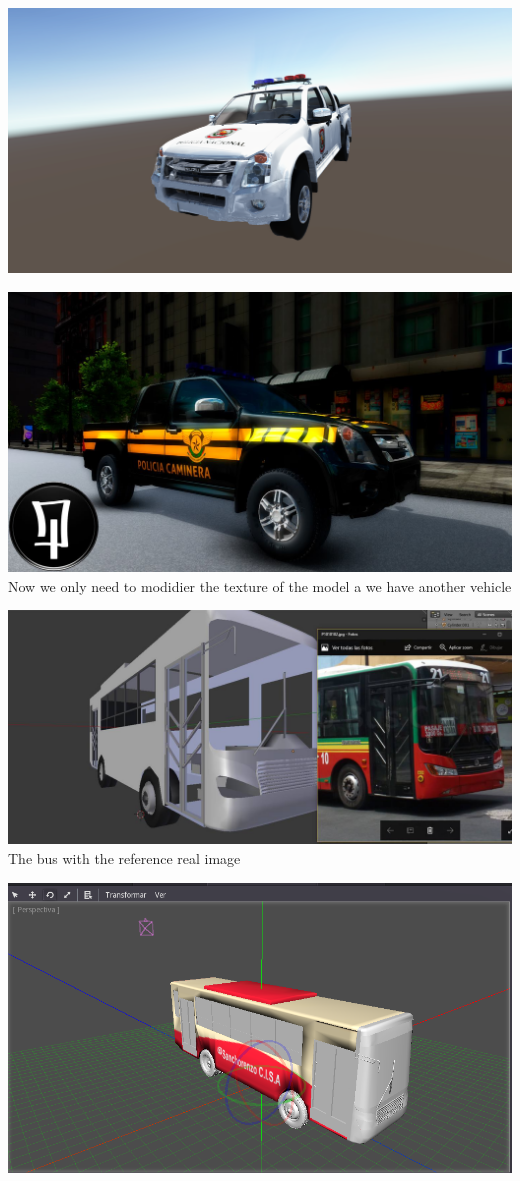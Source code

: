 \documentclass{article}
\begin{document}
  \includegraphics[width=\textwidth]{24.png}
  
  \includegraphics[width=\textwidth]{37.jpg}
  Now we only need to modidier the texture of the model a we have another vehicle
  
  \includegraphics[width=\textwidth]{43.jpg}
  The bus with the reference real image
  
  \includegraphics[width=\textwidth]{44.png}
\end{document}
